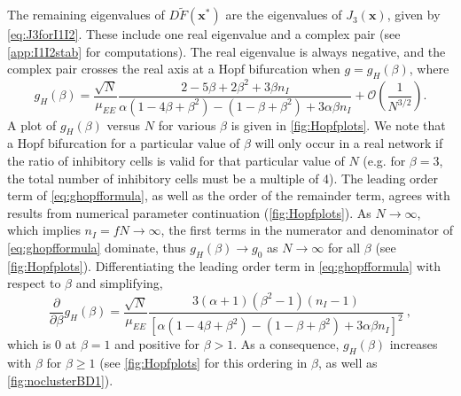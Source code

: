 \documentclass[reqno]{siamonline190516}
\newcommand{\xvec}{\mathbf{x}}
\begin{document}
The remaining eigenvalues of $D\tilde{F}(\xvec^*)$ are the eigenvalues of $J_3(\xvec)$, given by \cref{eq:J3forI1I2}. These include one real eigenvalue and a complex pair (see \cref{app:I1I2stab} for computations). The real eigenvalue is always negative, and the complex pair crosses the real axis at a Hopf bifurcation when $g = g_{H}(\beta)$, where
\begin{equation}\label{eq:ghopfformula}
    g_{H}(\beta) = 
    \frac{\sqrt{N}}{\mu_{EE}} 
    \frac{ 2 - 5\beta + 2 \beta^2 + 3 \beta n_I}
    { \alpha(1 - 4 \beta + \beta^2) - (1 - \beta + \beta^2) + 3 \alpha \beta n_I }
    + \mathcal{O}\left( \frac{1}{N^{3/2}} \right).
\end{equation}
A plot of $g_{H}(\beta)$ versus $N$ for various $\beta$ is given in \cref{fig:Hopfplots}. We note that a Hopf bifurcation for a particular value of $\beta$ will only occur in a real network if the ratio of inhibitory cells is valid for that particular value of $N$ (e.g. for $\beta = 3$, the total number of inhibitory cells must be a multiple of 4). The leading order term of \cref{eq:ghopfformula}, as well as the order of the remainder term, agrees with results from numerical parameter continuation (\cref{fig:Hopfplots}). As $N \rightarrow \infty$, which implies $n_I = f N \rightarrow \infty$, the first terms in the numerator and denominator of \cref{eq:ghopfformula} dominate, thus $g_{H}(\beta) \rightarrow g_0$ as $N \rightarrow \infty$ for all $\beta$ (see \cref{fig:Hopfplots}). Differentiating the leading order term in \cref{eq:ghopfformula} with respect to $\beta$ and simplifying,
\begin{equation}\label{eq:gprime}
\frac{\partial}{\partial \beta} g_{H}(\beta) = \frac{ \sqrt{N} }{ \mu_{EE} }
    \frac{ 
    3(\alpha+1)(\beta^2-1)(n_I-1)
    }
    { 
        \left[ \alpha(1 - 4 \beta + \beta^2) - (1 - \beta + \beta^2) + 3 \alpha \beta n_I \right]^2
    }\:,
\end{equation}
which is 0 at $\beta = 1$ and positive for $\beta > 1$. As a consequence, $g_{H}(\beta)$ increases with $\beta$ for $\beta \geq 1$ (see \cref{fig:Hopfplots} for this ordering in $\beta$, as well as \cref{fig:noclusterBD1}). 
\end{document}
